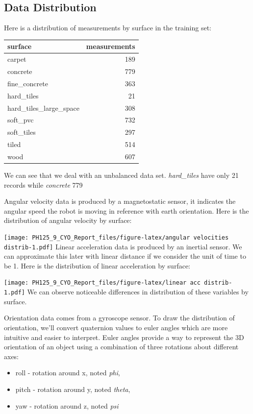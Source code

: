\documentclass[]{article}
\providecommand{\tightlist}{%
  \setlength{\itemsep}{0pt}\setlength{\parskip}{0pt}}
\begin{document}
\hypertarget{data-distribution}{%
\subsection{Data Distribution}\label{data-distribution}}

Here is a distribution of measurements by surface in the training set:

\begin{longtable}[]{@{}lr@{}}
\toprule
surface & measurements\tabularnewline
\midrule
\endhead
carpet & 189\tabularnewline
concrete & 779\tabularnewline
fine\_concrete & 363\tabularnewline
hard\_tiles & 21\tabularnewline
hard\_tiles\_large\_space & 308\tabularnewline
soft\_pvc & 732\tabularnewline
soft\_tiles & 297\tabularnewline
tiled & 514\tabularnewline
wood & 607\tabularnewline
\bottomrule
\end{longtable}

We can see that we deal with an unbalanced data set. \emph{hard\_tiles}
have only 21 records while \emph{concrete} 779

Angular velocity data is produced by a magnetostatic sensor, it
indicates the angular speed the robot is moving in reference with earth
orientation. Here is the distribution of angular velocity by surface:

\texttt{[image: PH125\_9\_CYO\_Report\_files/figure-latex/angular velocities distrib-1.pdf]}
Linear acceleration data is produced by an inertial sensor. We can
approximate this later with linear distance if we consider the unit of
time to be 1. Here is the distribution of linear acceleration by
surface:

\texttt{[image: PH125\_9\_CYO\_Report\_files/figure-latex/linear acc distrib-1.pdf]}
We can observe noticeable differences in distribution of these variables
by surface.

Orientation data comes from a gyroscope sensor. To draw the distribution
of orientation, we'll convert quaternion values to euler angles which
are more intuitive and easier to interpret. Euler angles provide a way
to represent the 3D orientation of an object using a combination of
three rotations about different axes:

\begin{itemize}
\tightlist
\item
  roll - rotation around x, noted \emph{phi},
\item
  pitch - rotation around y, noted \emph{theta},
\item
  yaw - rotation around z, noted \emph{psi}
\end{itemize}
\end{document}
